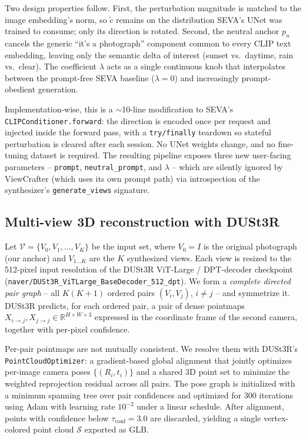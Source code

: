 \documentclass{article}
\begin{document}
Two design properties follow. First, the perturbation magnitude is
matched to the image embedding's norm, so $\tilde{c}$ remains on the
distribution SEVA's UNet was trained to consume; only its direction is
rotated. Second, the neutral anchor $p_n$ cancels the generic ``it's a
photograph'' component common to every CLIP text embedding, leaving
only the semantic delta of interest (sunset vs.~daytime, rain
vs.~clear). The coefficient $\lambda$ acts as a single continuous knob
that interpolates between the prompt-free SEVA baseline ($\lambda = 0$)
and increasingly prompt-obedient generation.

Implementation-wise, this is a $\sim$10-line modification to SEVA's
\texttt{CLIPConditioner.forward}: the direction is encoded once per
request and injected inside the forward pass, with a
\texttt{try/finally} teardown so stateful perturbation is cleared
after each session. No UNet weights change, and no fine-tuning dataset
is required. The resulting pipeline exposes three new user-facing
parameters -- \texttt{prompt}, \texttt{neutral\_prompt}, and $\lambda$
-- which are silently ignored by ViewCrafter (which uses its own prompt
path) via introspection of the synthesizer's \texttt{generate\_views}
signature.

\subsection{Multi-view 3D reconstruction with DUSt3R}
\label{sec:method-dust3r}

Let $\mathcal{V} = \{V_0, V_1, \ldots, V_K\}$ be the input set, where
$V_0 = I$ is the original photograph (our anchor) and $V_{1\ldots K}$
are the $K$ synthesized views. Each view is resized to the 512-pixel
input resolution of the DUSt3R ViT-Large / DPT-decoder checkpoint
(\texttt{naver/DUSt3R\_ViTLarge\_BaseDecoder\_512\_dpt}). We form a
\emph{complete directed pair graph} -- all $K(K+1)$ ordered pairs
$(V_i, V_j)$, $i \neq j$ -- and symmetrize it. DUSt3R predicts, for
each ordered pair, a pair of dense pointmaps
$X_{i \to j}, X_{j \to j} \in \mathbb{R}^{H \times W \times 3}$
expressed in the coordinate frame of the second camera, together with
per-pixel confidence.

Per-pair pointmaps are not mutually consistent. We resolve them with
DUSt3R's \texttt{PointCloudOptimizer}: a gradient-based global
alignment that jointly optimizes per-image camera poses
$\{(R_i, t_i)\}$ and a shared 3D point set to minimize the weighted
reprojection residual across all pairs. The pose graph is initialized
with a minimum spanning tree over pair confidences and optimized for
300 iterations using Adam with learning rate $10^{-2}$ under a linear
schedule. After alignment, points with confidence below
$\tau_{\mathrm{conf}} = 3.0$ are discarded, yielding a single
vertex-colored point cloud $\mathcal{S}$ exported as GLB.
\end{document}
